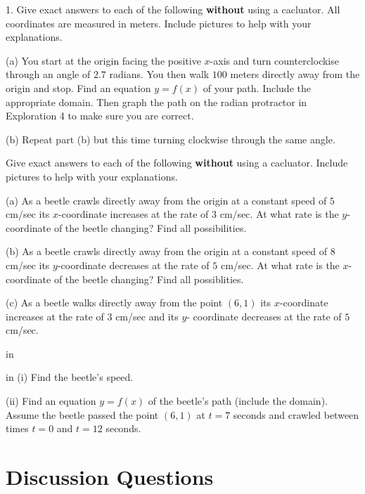 \documentclass{ximera}
\newcommand{\pskip}{\vskip 0.1 in}
\begin{document}
\begin{question}  \label{Qsdg53:Cosine}
1. Give exact answers to each of the following {\bf without} using a cacluator. All coordinates are measured in meters. Include pictures to help with your explanations.

(a) You start at the origin facing the positive $x$-axis and turn counterclockise through an angle of $2.7$ radians. You then walk $100$ meters directly away from the origin and stop. Find an equation $y=f(x)$ of your path. Include the appropriate domain. Then graph the path on the radian protractor in Exploration 4 to make sure you are correct.

(b) Repeat part (b) but this time turning clockwise through the same angle. 


\end{question}



\begin{question} \label{Qet433:Cosine}
Give exact answers to each of the following {\bf without} using a cacluator. Include pictures to help with your explanations.

(a) As a beetle crawls directly away from the origin at a constant speed of $5$ cm/sec its $x$-coordinate increases at the rate of $3$ cm/sec. At what rate is the $y$-coordinate of the beetle changing? Find all possibilities. 

(b) As a beetle crawls directly away from the origin at a constant speed of $8$ cm/sec its $y$-coordinate decreases at the rate of $5$ cm/sec. At what rate is the $x$-coordinate of the beetle changing? Find all possiblities. 

(c) As a beetle walks directly away from the point $(6,1)$ its $x$-coordinate increases at the rate of $3$ cm/sec and its $y$-
coordinate decreases at the rate of $5$ cm/sec. 

\pskip

 in (i) Find the beetle's speed. 

(ii) Find an equation $y=f(x)$ of the beetle's path (include the domain). Assume the beetle passed the point $(6,1)$ at $t=7$ seconds and crawled between times $t=0$ and $t=12$ seconds. 

\end{question}


\section{Discussion Questions}
\end{document}
